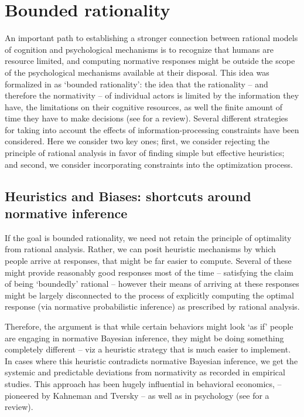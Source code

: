 \section{Bounded rationality}
\label{sec:psych_BR}

An important path to establishing a stronger connection between rational models of cognition and psychological mechanisms is to recognize that humans are resource limited, and computing normative responses might be outside the scope of the psychological mechanisms available at their disposal. This idea was formalized in \citet{simon1955behavioral} as `bounded rationality': the idea that the rationality -- and therefore the normativity -- of individual actors is limited by the information they have, the limitations on their cognitive resources, as well the finite amount of time they have to make decisions (see \citet{russell2016rationality} for a review). Several different strategies for taking into account the effects of information-processing constraints have been considered. Here we consider two key ones; first, we consider rejecting the principle of rational analysis in favor of finding simple but effective heuristics; and second, we consider incorporating constraints into the optimization process.

\subsection{Heuristics and Biases: shortcuts around normative inference}

If the goal is bounded rationality, we need not retain the principle of optimality from rational analysis. Rather, we can posit heuristic mechanisms by which people arrive at responses, that might be far easier to compute. Several of these might provide reasonably good responses most of the time -- satisfying the claim of being `boundedly' rational -- however their means of arriving at these responses might be largely disconnected to the process of explicitly computing the optimal response (via normative probabilistic inference) as prescribed by rational analysis.

Therefore, the argument is that while certain behaviors might look `as if' people are engaging in normative Bayesian inference, they might be doing something completely different -- viz a heuristic strategy that is much easier to implement. In cases where this heuristic contradicts normative Bayesian inference, we get the systemic and predictable deviations from normativity as recorded in empirical studies. This approach has been hugely influential in behavioral economics, -- pioneered by Kahneman and Tversky\cite{tversky} -- as well as in psychology (see \citet{gigerenzer2002bounded} for a review). 

